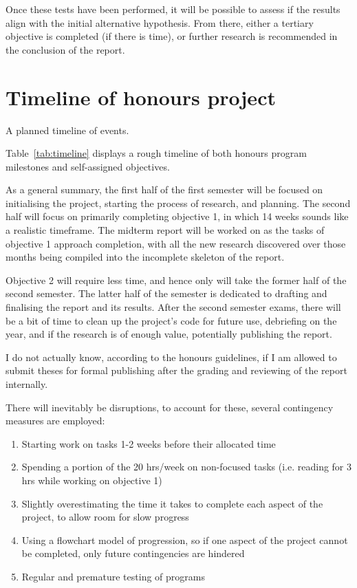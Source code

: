 Once these tests have been performed, it will be possible to assess if the results align with the initial alternative hypothesis. From there, either a tertiary objective is completed (if there is time), or further research is recommended in the conclusion of the report.

\section{Timeline of honours project}
\label{sec:timeline}

\begin{table}[ht]
  \centering
  
  \caption{A planned timeline of events.}
  \label{tab:timeline}
\end{table}

Table~\ref{tab:timeline} displays a rough timeline of both honours program milestones and self-assigned objectives.

As a general summary, the first half of the first semester will be focused on initialising the project, starting the process of research, and planning. The second half will focus on primarily completing objective 1, in which 14 weeks sounds like a realistic timeframe. The midterm report will be worked on as the tasks of objective 1 approach completion, with all the new research discovered over those months being compiled into the incomplete skeleton of the report.

Objective 2 will require less time, and hence only will take the former half of the second semester. The latter half of the semester is dedicated to drafting and finalising the report and its results. After the second semester exams, there will be a bit of time to clean up the project's code for future use, debriefing on the year, and if the research is of enough value, potentially publishing the report.

I do not actually know, according to the honours guidelines, if I am allowed to submit theses for formal publishing after the grading and reviewing of the report internally.

There will inevitably be disruptions, to account for these, several contingency measures are employed:
\begin{enumerate}
\item Starting work on tasks 1-2 weeks before their allocated time
\item Spending a portion of the 20 hrs/week on non-focused tasks (i.e. reading for 3 hrs while working on objective 1)
\item Slightly overestimating the time it takes to complete each aspect of the project, to allow room for slow progress
\item Using a flowchart model of progression, so if one aspect of the project cannot be completed, only future contingencies are hindered
\item Regular and premature testing of programs
\end{enumerate}

